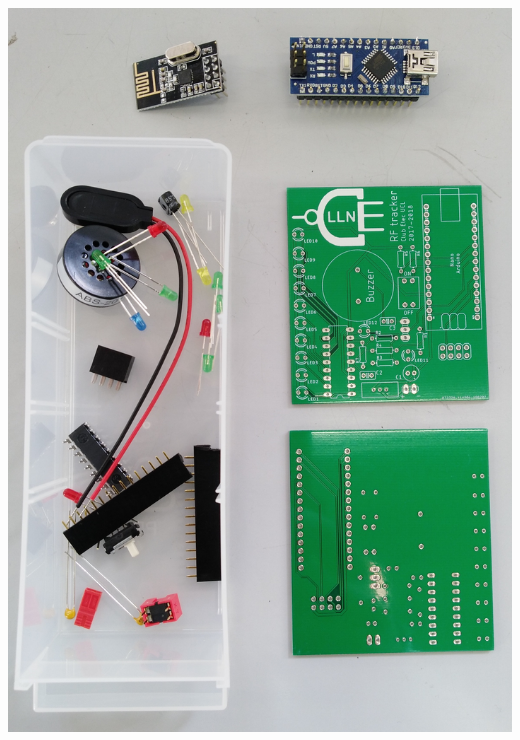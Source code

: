 \documentclass[a4paper,10pt,twoside]{article}
\begin{document}
\begin{minipage}[c]{.49\textwidth}
	\centering
	\includegraphics[width=\textwidth]{imgs/RF_TAG_components.jpg}
	\label{fig:RF_TAG_components}
\end{minipage}
\hfill
\end{document}
